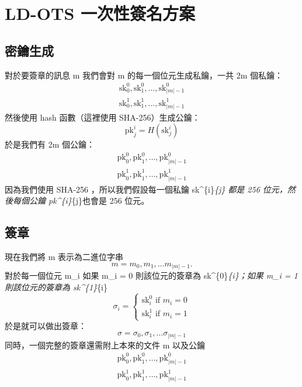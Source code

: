 \documentclass[
]{article}
\begin{document}
\hypertarget{ld-ots-ux4e00ux6b21ux6027ux7c3dux540dux65b9ux6848}{%
\section{LD-OTS
一次性簽名方案}\label{ld-ots-ux4e00ux6b21ux6027ux7c3dux540dux65b9ux6848}}

\hypertarget{ux5bc6ux9470ux751fux6210}{%
\subsection{密鑰生成}\label{ux5bc6ux9470ux751fux6210}}

對於要簽章的訊息 m 我們會對 m 的每一個位元生成私鑰，一共 2m 個私鑰： \[
\begin{aligned}
\mathrm{sk}^{0}_{0},\mathrm{sk}^{0}_{1},\dots,\mathrm{sk}^{0}_{|m|-1}\\
\mathrm{sk}^{1}_{0},\mathrm{sk}^{1}_{1},\dots,\mathrm{sk}^{1}_{|m|-1}
\end{aligned}
\] 然後使用 hash 函數（這裡使用 SHA-256）生成公鑰： \[
\mathrm{pk}^{i}_{j}= H(\mathrm{sk}^{i}_{j})
\] 於是我們有 2m 個公鑰： \[
\begin{aligned}
\mathrm{pk}^{0}_{0},\mathrm{pk}^{0}_{1},\dots,\mathrm{pk}^{0}_{|m|-1}\\
\mathrm{pk}^{1}_{0},\mathrm{pk}^{1}_{1},\dots,\mathrm{pk}^{1}_{|m|-1}
\end{aligned}
\] 因為我們使用 SHA-256 ，所以我們假設每一個私鑰 sk\^{}\{i\}\emph{\{j\}
都是 256 位元，然後每個公鑰 pk\^{}\{i\}}\{j\}也會是 256 位元。

\hypertarget{ux7c3dux7ae0}{%
\subsection{簽章}\label{ux7c3dux7ae0}}

現在我們將 m 表示為二進位字串 \[
m = m_{0},m_{1},\dots m_{|m|-1}.
\] 對於每一個位元 m\_i 如果 m\_i = 0 則該位元的簽章為
sk\^{}\{0\}\emph{\{i\}；如果 m\_i = 1 則該位元的簽章為 sk\^{}\{1\}}\{i\}
\[
\sigma_{i} =
\left\{
\begin{aligned}
\mathrm{sk}^{0}_{i} \text{ if }m_{i}=0
\\
\mathrm{sk}^{1}_{i} \text{ if }m_{i}=1
\end{aligned}\right.
\] 於是就可以做出簽章： \[
\sigma = \sigma_{0},\sigma_{1},\dots \sigma_{|m|-1}
\] 同時，一個完整的簽章還需附上本來的文件 m 以及公鑰 \[
\begin{aligned}
\mathrm{pk}^{0}_{0},\mathrm{pk}^{0}_{1},\dots,\mathrm{pk}^{0}_{|m|-1}\\
\mathrm{pk}^{1}_{0},\mathrm{pk}^{1}_{1},\dots,\mathrm{pk}^{1}_{|m|-1}
\end{aligned}
\]
\end{document}
